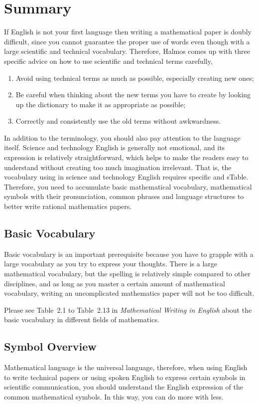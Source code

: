 \section{Summary}
If English is not your first language then writing a mathematical paper is doubly difficult, since you cannot guarantee the proper use of words even though with a large scientific and technical vocabulary. Therefore, Halmos comes up with three specific advice on how to use scientific and technical terms carefully,
\begin{enumerate}[label={\Alph*.}]
	\item Avoid using technical terms as much as possible, especially creating new ones;
	\item Be careful when thinking about the new terms you have to create by looking up the dictionary to make it as appropriate as possible;
	\item Correctly and consistently use the old terms without awkwardness.
\end{enumerate}

In addition to the terminology, you should also pay attention to the language itself. Science and technology English is generally not emotional, and its expression is relatively straightforward, which helps to make the readers easy to understand without creating too much imagination irrelevant. That is, the vocabulary using in science and technology English requires specific and sTable. Therefore, you need to accumulate basic mathematical vocabulary, mathematical symbols with their pronunciation, common phrases and language structures to better write rational mathematics papers.


\subsection{Basic Vocabulary}
Basic vocabulary is an important prerequisite because you have to grapple with a large vocabulary as you try to express your thoughts. There is a large mathematical vocabulary, but the spelling is relatively simple compared to other disciplines, and as long as you master a certain amount of mathematical vocabulary, writing an uncomplicated mathematics paper will not be too difficult.

Please see Table~2.1 to Table~2.13 in \emph{Mathematical Writing in English}\cite{2013数学之英文写作} about the basic vocabulary in different fields of mathematics.


\subsection{Symbol Overview}
Mathematical language is the universal language, therefore, when using English to write technical papers or using spoken English to express certain symbols in scientific communication, you should understand the English expression of the common mathematical symbols. In this way, you can do more with less.

